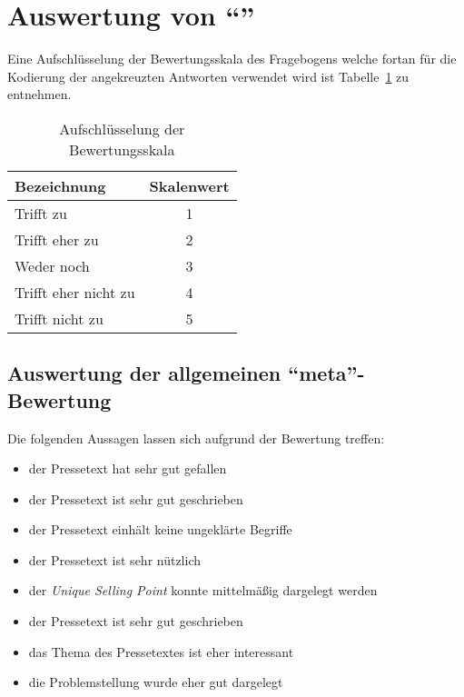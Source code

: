 


 





\section{Auswertung von \enquote{\varpressetext}}

Eine Aufschlüsselung der Bewertungsskala des Fragebogens welche fortan für die
Kodierung der angekreuzten Antworten verwendet wird ist
Tabelle~\ref{tab:skala} zu entnehmen.

\begin{table}[!ht]
    \caption{Aufschlüsselung der Bewertungsskala}
    \label{tab:skala}
    \begin{center}
        \begin{tabular}{lc}
        \toprule
        \textbf{Bezeichnung} & \textbf{Skalenwert} \\
        \midrule
        Trifft zu & 1 \\
        Trifft eher zu & 2 \\
        Weder noch & 3 \\
        Trifft eher nicht zu & 4 \\
        Trifft nicht zu & 5 \\
        \bottomrule
        \end{tabular}
    \end{center}
\end{table}

\subsection{Auswertung der allgemeinen \enquote{meta}-Bewertung}

Die folgenden Aussagen lassen sich aufgrund der Bewertung treffen:

\begin{itemize}
    \item der Pressetext hat sehr gut gefallen
    \item der Pressetext ist sehr gut geschrieben
    \item der Pressetext einhält keine ungeklärte Begriffe
    \item der Pressetext ist sehr nützlich
    \item der \emph{Unique Selling Point} konnte mittelmäßig dargelegt werden
    \item der Pressetext ist sehr gut geschrieben
    \item das Thema des Pressetextes ist eher interessant
    \item die Problemstellung wurde eher gut dargelegt
\end{itemize}

